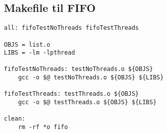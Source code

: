 \subsection{Makefile til FIFO}
\begin{lstlisting}
all: fifoTestNoThreads fifoTestThreads

OBJS = list.o
LIBS = -lm -lpthread

fifoTestNoThreads: testNoThreads.o ${OBJS}
	gcc -o $@ testNoThreads.o ${OBJS} ${LIBS}

fifoTestThreads: testThreads.o ${OBJS}
	gcc -o $@ testThreads.o ${OBJS} ${LIBS}

clean:
	rm -rf *o fifo

\end{lstlisting}